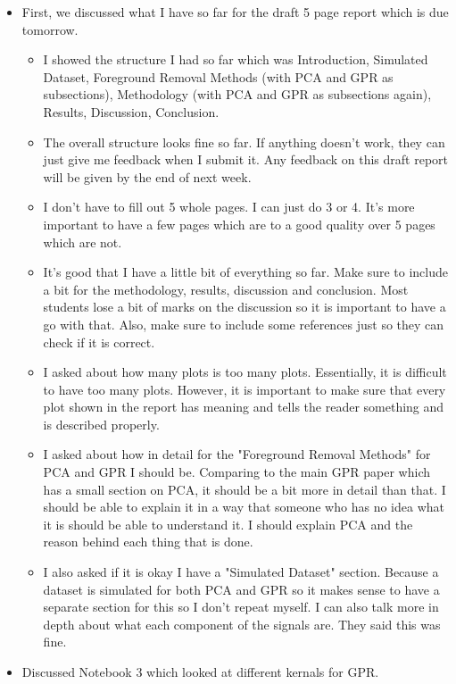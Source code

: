 \begin{itemize}
    \item First, we discussed what I have so far for the draft 5 page report which is due tomorrow.
    \begin{itemize}
        \item I showed the structure I had so far which was Introduction, Simulated Dataset, Foreground Removal Methods (with PCA and GPR as subsections), Methodology (with PCA and GPR as subsections again), Results, Discussion, Conclusion.
        \item The overall structure looks fine so far. If anything doesn't work, they can just give me feedback when I submit it. Any feedback on this draft report will be given by the end of next week.
        \item I don't have to fill out 5 whole pages. I can just do 3 or 4. It's more important to have a few pages which are to a good quality over 5 pages which are not.
        \item It's good that I have a little bit of everything so far. Make sure to include a bit for the methodology, results, discussion and conclusion. Most students lose a bit of marks on the discussion so it is important to have a go with that. Also, make sure to include some references just so they can check if it is correct.
        \item I asked about how many plots is too many plots. Essentially, it is difficult to have too many plots. However, it is important to make sure that every plot shown in the report has meaning and tells the reader something and is described properly.
        \item I asked about how in detail for the "Foreground Removal Methods" for PCA and GPR I should be. Comparing to the main GPR paper which has a small section on PCA, it should be a bit more in detail than that. I should be able to explain it in a way that someone who has no idea what it is should be able to understand it. I should explain PCA and the reason behind each thing that is done.
        \item I also asked if it is okay I have a "Simulated Dataset" section. Because a dataset is simulated for both PCA and GPR so it makes sense to have a separate section for this so I don't repeat myself. I can also talk more in depth about what each component of the signals are. They said this was fine.
    \end{itemize}
\item Discussed Notebook 3 which looked at different kernals for GPR.

\end{itemize}
